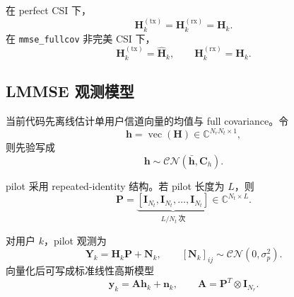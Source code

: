 \documentclass[11pt]{ctexart}
\newcommand{\Id}{\bm{I}}
\newcommand{\code}[1]{\texttt{#1}}
\begin{document}
在 perfect CSI 下，
\begin{equation}
    \bm{H}_k^{(\mathrm{tx})}
    =
    \bm{H}_k^{(\mathrm{rx})}
    =
    \bm{H}_k.
\end{equation}
在 \code{mmse\_fullcov} 非完美 CSI 下，
\begin{equation}
    \bm{H}_k^{(\mathrm{tx})}
    =
    \widehat{\bm{H}}_k,
    \qquad
    \bm{H}_k^{(\mathrm{rx})}
    =
    \bm{H}_k.
\end{equation}

\subsection{LMMSE 观测模型}
当前代码先离线估计单用户信道向量的均值与 full covariance。令
\begin{equation}
    \bm{h}
    =
    \operatorname{vec}(\bm{H})
    \in
    \mathbb{C}^{N_rN_t\times 1},
\end{equation}
则先验写成
\begin{equation}
    \bm{h}
    \sim
    \mathcal{CN}(\bar{\bm{h}},\bm{C}_h).
\end{equation}

pilot 采用 repeated-identity 结构。若 pilot 长度为 $L$，则
\begin{equation}
    \bm{P}
    =
    \underbrace{
        \left[
            \Id_{N_t},\Id_{N_t},\ldots,\Id_{N_t}
        \right]
    }_{L/N_t\ \text{次}}
    \in
    \mathbb{C}^{N_t\times L}.
\end{equation}

对用户 $k$，pilot 观测为
\begin{equation}
    \bm{Y}_k
    =
    \bm{H}_k\bm{P}
    +
    \bm{N}_k,
    \qquad
    [\bm{N}_k]_{ij}\sim\mathcal{CN}(0,\sigma_p^2).
\end{equation}
向量化后可写成标准线性高斯模型
\begin{equation}
    \bm{y}_k
    =
    \bm{A}\bm{h}_k+\bm{n}_k,
    \qquad
    \bm{A}
    =
    \bm{P}^T\otimes \Id_{N_r}.
\end{equation}
\end{document}

